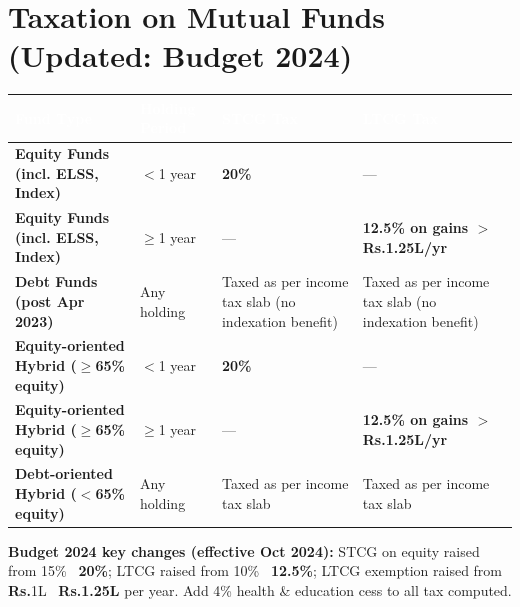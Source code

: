 \documentclass[11pt,a4paper]{article}
\newcommand{\rupee}{\textbf{\textsf{Rs.}}}
\begin{document}
\section{Taxation on Mutual Funds (Updated: Budget 2024)}

\begingroup
\setlength{\arrayrulewidth}{0.55pt}
\begin{tabularx}{\linewidth}{|>{\raggedright\arraybackslash\bfseries\small\sffamily}p{3.9cm}|>{\centering\small\arraybackslash}p{2.5cm}|>{\centering\small\arraybackslash}X|>{\centering\small\arraybackslash}X|}
\hline
\rowcolor{primary!90}
\textcolor{white}{\small Fund Type} & \textcolor{white}{\small Holding Period} &
\textcolor{white}{\small STCG Tax} & \textcolor{white}{\small LTCG Tax} \\
\hline
\rowcolor{lightbg}
Equity Funds (incl. ELSS, Index) & $<$1 year & \textcolor{negative}{\textbf{20\%}} & --- \\
\hline
\rowcolor{lightbg}
Equity Funds (incl. ELSS, Index) & $\geq$1 year & --- & \textcolor{positive}{\textbf{12.5\% on gains $>$\rupee{}1.25L/yr}} \\
\hline
Debt Funds (post Apr 2023) & Any holding &
\textcolor{negative}{Taxed as per income tax slab (no indexation benefit)} &
\textcolor{negative}{Taxed as per income tax slab (no indexation benefit)} \\
\hline
\rowcolor{lightbg}
Equity-oriented Hybrid ($\geq$65\% equity) & $<$1 year & \textcolor{negative}{\textbf{20\%}} & --- \\
\hline
\rowcolor{lightbg}
Equity-oriented Hybrid ($\geq$65\% equity) & $\geq$1 year & --- & \textcolor{positive}{\textbf{12.5\% on gains $>$\rupee{}1.25L/yr}} \\
\hline
Debt-oriented Hybrid ($<$65\% equity) & Any holding &
\textcolor{negative}{Taxed as per income tax slab} &
\textcolor{negative}{Taxed as per income tax slab} \\
\hline
\end{tabularx}
\endgroup

\vspace{4pt}
\begin{tcolorbox}[enhanced, colback=lightaccent, colframe=accent, arc=2pt, boxrule=0.8pt,
  left=6pt, right=6pt, top=3pt, bottom=3pt]
\footnotesize\sffamily\textcolor{primary}{\textbf{Budget 2024 key changes (effective Oct 2024):}}
STCG on equity raised from 15\% \textrightarrow\ \textbf{20\%}; LTCG raised from 10\% \textrightarrow\ \textbf{12.5\%}; LTCG exemption raised from \rupee{}1L \textrightarrow\ \textbf{\rupee{}1.25L} per year.  Add 4\% health \& education cess to all tax computed.
\end{tcolorbox}
\end{document}
